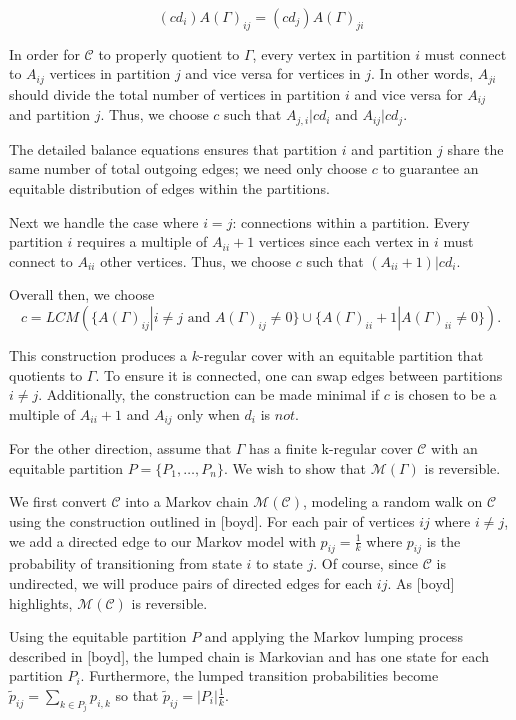 $$
(c d_i) A(\Gamma)_{ij} = (c d_j) A(\Gamma)_{ji}
$$

In order for $\mathcal{C}$ to properly quotient to $\Gamma$, every vertex in partition $i$ must connect to $A_{ij}$ vertices in partition $j$ and vice versa for vertices in $j$. In other words, $A_{ji}$ should divide the total number of vertices in partition $i$ and vice versa for $A_{ij}$ and partition $j$. Thus, we choose $c$ such that $A_{j, i} | c d_i$ and $A_{ij} | c d_j$. 

The detailed balance equations ensures that partition $i$ and partition $j$ share the same number of total outgoing edges; we need only choose $c$ to guarantee an equitable distribution of edges within the partitions.

Next we handle the case where $i = j$: connections within a partition. Every partition $i$ requires a multiple of $A_{ii} + 1$ vertices since each vertex in $i$ must connect to $A_{ii}$ other vertices. Thus, we choose $c$ such that $(A_{ii} + 1) | c d_i$. 

Overall then, we choose 
$$
  c = LCM(\lbrace A(\Gamma)_{ij} | i \neq j \text{ and } A(\Gamma)_{ij} \neq 0 \rbrace \cup \lbrace A(\Gamma)_{ii} + 1 | A(\Gamma)_{ii} \neq 0 \rbrace).
$$

This construction produces a $k$-regular cover with an equitable partition that quotients to $\Gamma$. To ensure it is connected, one can swap edges between partitions $i \neq j$. Additionally, the construction can be made minimal if $c$ is chosen to be a multiple of $A_{ii} + 1$ and $A_{ij}$ only when $d_i$ is $\textit{not}$.

For the other direction, assume that $\Gamma$ has a finite k-regular cover $\mathcal{C}$ with an equitable partition $P = \lbrace P_1, \ldots, P_n \rbrace$. We wish to show that $\mathcal{M} ( \Gamma )$ is reversible. 

We first convert $\mathcal{C}$ into a Markov chain $\mathcal{M} ( \mathcal{C} )$, modeling a random walk on $\mathcal{C}$ using the construction outlined in [boyd]. For each pair of vertices $ij$ where $i \neq j$, we add a directed edge to our Markov model with $p_{ij} = \frac{1}{k}$ where $p_{ij}$ is the probability of transitioning from state $i$ to state $j$. Of course, since  $\mathcal{C}$ is undirected, we will produce pairs of directed edges for each $ij$. As [boyd] highlights, $\mathcal{M} (\mathcal{C})$ is reversible.

Using the equitable partition $P$ and applying the Markov lumping process described in [boyd], the lumped chain is Markovian and has one state for each partition $P_i$. Furthermore, the lumped transition probabilities become $\tilde{p}_{ij} = \sum_{k \in P_j} p_{i, k}$ so that $\tilde{p}_{ij} = |P_i| \frac{1}{k}$. 

